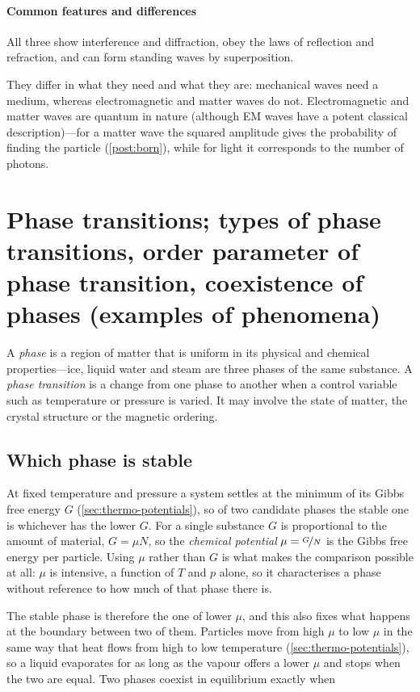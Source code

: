     \paragraph{Common features and differences}

    All three show interference and diffraction, obey the laws of reflection and refraction, and can form standing waves by superposition. 
    
    They differ in what they need and what they are: mechanical waves need a medium, whereas electromagnetic and matter waves do not. Electromagnetic and matter waves are quantum in nature (although EM waves have a potent classical description)---for a matter wave the squared amplitude gives the probability of finding the particle (\cref{post:born}), while for light it corresponds to the number of photons.

\section{Phase transitions; types of phase transitions, order parameter of phase transition, coexistence of phases (examples of phenomena)}
\label{sec:phase-transitions}

    A \emph{phase} is a region of matter that is uniform in its physical and chemical properties---ice, liquid water and steam are three phases of the same substance. A \emph{phase transition} is a change from one phase to another when a control variable such as temperature or pressure is varied. It may involve the state of matter, the crystal structure or the magnetic ordering.

    \subsection{Which phase is stable}

        At fixed temperature and pressure a system settles at the minimum of its Gibbs free energy $G$ (\cref{sec:thermo-potentials}), so of two candidate phases the stable one is whichever has the lower $G$. For a single substance $G$ is proportional to the amount of material, $G = \mu N$, so the \emph{chemical potential} $\mu = \nicefrac{G}{N}$ is the Gibbs free energy per particle. Using $\mu$ rather than $G$ is what makes the comparison possible at all: $\mu$ is intensive, a function of $T$ and $p$ alone, so it characterises a phase without reference to how much of that phase there is.

        The stable phase is therefore the one of lower $\mu$, and this also fixes what happens at the boundary between two of them. Particles move from high $\mu$ to low $\mu$ in the same way that heat flows from high to low temperature (\cref{sec:thermo-potentials}), so a liquid evaporates for as long as the vapour offers a lower $\mu$ and stops when the two are equal. Two phases coexist in equilibrium exactly when

